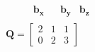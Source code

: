 \documentclass[preview]{standalone}
\begin{document}
\begin{align*}
\begin{array}{ccc}\begin{matrix}\hspace{1cm} \mathbf{b_{x}}  & & \mathbf{b_{y}} & \mathbf{b_{z}} \end{matrix} \\ \mathbf{Q} = \begin{bmatrix} 2 & 1 & 1 \\ 0 & 2 & 3 \end{bmatrix} \end{array}
\end{align*}
\end{document}
